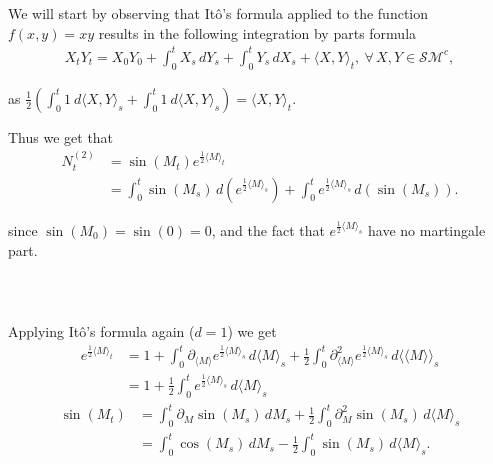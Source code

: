 \documentclass{beamer}
\numberwithin{equation}{section}
\newenvironment{frame2}{\begin{frame}\frametitle{{\normalsize \secname} \\ {\large \subsecname}}}{\end{frame}}
\begin{document}
\begin{frame2}
    We will start by observing that Itô's formula applied to the function $f(x,y) = xy$ results in the following integration by parts formula
    \begin{align*}
        X_tY_t = X_0Y_0 + \int_0^t X_s \, dY_s + \int_0^tY_s\, dX_s + \langle X,Y \rangle_t, \ \forall\, X,Y \in \mathcal{SM}^c,
    \end{align*}
    
    \begingroup
    \footnotesize
    \color{gray}
    as $\frac{1}{2}\left(\int_0^t 1 \ d\langle X, Y \rangle_s + \int_0^t 1 \ d\langle X, Y \rangle_s\right) = \langle X, Y \rangle_t.$
    \endgroup
    \vspace{10pt}

    Thus we get that
    \begin{align}
         N_t^{(2)} &= \sin(M_t)e^{\frac{1}{2}\langle M \rangle_t} \\
        &= \int_0^t \sin(M_s) \, d\left(e^{\frac{1}{2}\langle M \rangle_s}\right) + \int_0^t e^{\frac{1}{2}\langle M \rangle_s} \, d \left(\sin(M_s)\right).
    \end{align}

    \begingroup
    \footnotesize
    \color{gray}
    since $\sin(M_0) = \sin(0) = 0$, and the fact that $e^{\frac{1}{2} \langle M \rangle_s}$ have no martingale part.
    \endgroup
\end{frame2}

\begin{frame2}
    Applying Itô's formula again ($d = 1$) we get
    \begin{align}
        e^{\frac{1}{2}\langle M \rangle_t} &= 1 + \int_0^t\partial_{\langle M \rangle}e^{\frac{1}{2}\langle M \rangle_s}\, d\langle M \rangle_s + \frac{1}{2}\int_0^t\partial^2_{\langle M \rangle} e^{\frac{1}{2}\langle M \rangle_s} \, d \langle\langle M \rangle\rangle_s \nonumber \\
        &= 1 + \frac{1}{2}\int_0^te^{\frac{1}{2}\langle M \rangle_s}\, d\langle M \rangle_s
    \end{align}
    \begin{align}
        \sin(M_t) &= \int_0^t\partial_{M}\sin(M_s)\, dM_s + \frac{1}{2}\int_0^t\partial_{M}^2\sin(M_s) \, d \langle M \rangle_s \\
        &= \int_0^t \cos(M_s) \, dM_s - \frac{1}{2}\int_0^t\sin(M_s)\, d\langle M \rangle_s.
    \end{align}
\end{frame2}
\end{document}
